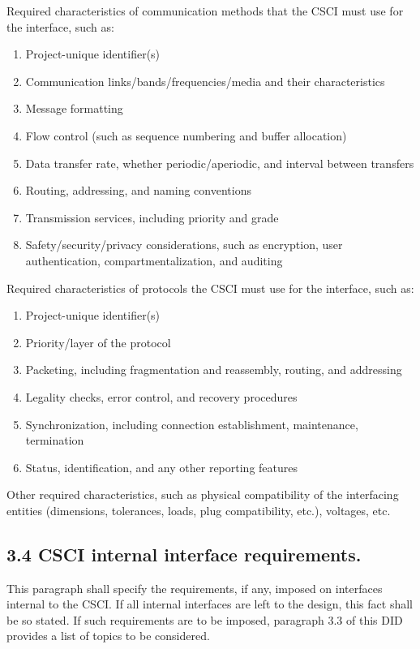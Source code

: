 Required characteristics of communication methods that the CSCI must use
for the interface, such as:

\begin{enumerate}
\itemsep1pt\parskip0pt
\item
  Project-unique identifier(s)
\item
  Communication links/bands/frequencies/media and their characteristics
\item
  Message formatting
\item
  Flow control (such as sequence numbering and buffer allocation)
\item
  Data transfer rate, whether periodic/aperiodic, and interval between
  transfers
\item
  Routing, addressing, and naming conventions
\item
  Transmission services, including priority and grade
\item
  Safety/security/privacy considerations, such as encryption, user
  authentication, compartmentalization, and auditing
\end{enumerate}

Required characteristics of protocols the CSCI must use for the
interface, such as:

\begin{enumerate}
\itemsep1pt\parskip0pt
\item
  Project-unique identifier(s)
\item
  Priority/layer of the protocol
\item
  Packeting, including fragmentation and reassembly, routing, and
  addressing
\item
  Legality checks, error control, and recovery procedures
\item
  Synchronization, including connection establishment, maintenance,
  termination
\item
  Status, identification, and any other reporting features
\end{enumerate}

Other required characteristics, such as physical compatibility of the
interfacing entities (dimensions, tolerances, loads, plug compatibility,
etc.), voltages, etc.

\subsection{3.4 CSCI internal interface requirements.}

This paragraph shall specify the requirements, if any, imposed on
interfaces internal to the CSCI. If all internal interfaces are left to
the design, this fact shall be so stated. If such requirements are to be
imposed, paragraph 3.3 of this DID provides a list of topics to be
considered.


